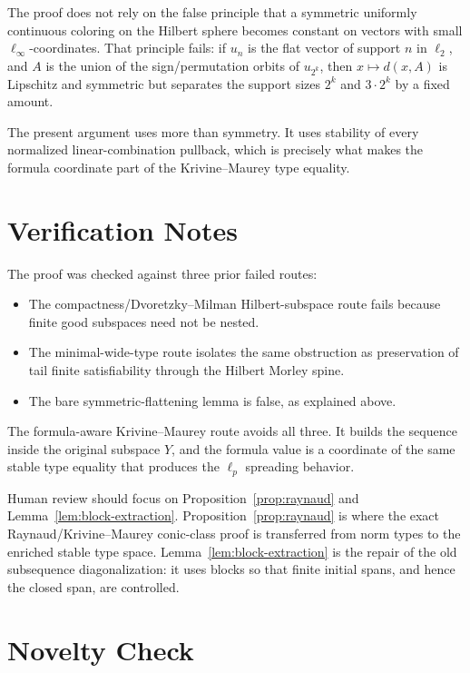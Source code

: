 \documentclass[11pt]{article}
\begin{document}
The proof does not rely on the false principle that a symmetric uniformly
continuous coloring on the Hilbert sphere becomes constant on vectors with
small \(\ell_\infty\)-coordinates. That principle fails: if \(u_n\) is the
flat vector of support \(n\) in \(\ell_2\), and \(A\) is the union of the
sign/permutation orbits of \(u_{2^k}\), then \(x\mapsto d(x,A)\) is
Lipschitz and symmetric but separates the support sizes \(2^k\) and
\(3\cdot2^k\) by a fixed amount.

The present argument uses more than symmetry. It uses stability of every
normalized linear-combination pullback, which is precisely what makes the
formula coordinate part of the Krivine--Maurey type equality.

\section*{Verification Notes}

The proof was checked against three prior failed routes:
\begin{itemize}
\item The compactness/Dvoretzky--Milman Hilbert-subspace route fails because
  finite good subspaces need not be nested.
\item The minimal-wide-type route isolates the same obstruction as preservation
  of tail finite satisfiability through the Hilbert Morley spine.
\item The bare symmetric-flattening lemma is false, as explained above.
\end{itemize}

The formula-aware Krivine--Maurey route avoids all three. It builds the
sequence inside the original subspace \(Y\), and the formula value is a
coordinate of the same stable type equality that produces the \(\ell_p\)
spreading behavior.

Human review should focus on Proposition~\ref{prop:raynaud} and
Lemma~\ref{lem:block-extraction}. Proposition~\ref{prop:raynaud} is where the
exact Raynaud/Krivine--Maurey conic-class proof is transferred from norm types
to the enriched stable type space. Lemma~\ref{lem:block-extraction} is the
repair of the old subsequence diagonalization: it uses blocks so that finite
initial spans, and hence the closed span, are controlled.

\section*{Novelty Check}
\end{document}
